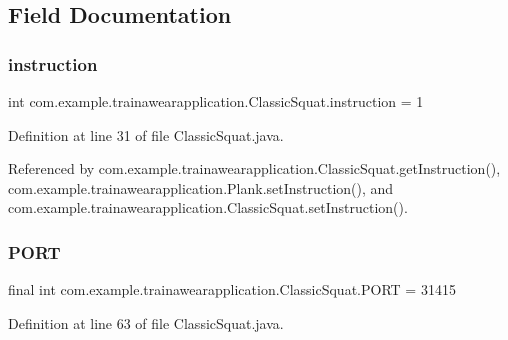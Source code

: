 \subsection{Field Documentation}
\mbox{\label{classcom_1_1example_1_1trainawearapplication_1_1_classic_squat_a3cbf1db0a5560d931ebdaa407a1a6285}} 
\subsubsection{\texorpdfstring{instruction}{instruction}}
{\footnotesize\ttfamily int com.\+example.\+trainawearapplication.\+Classic\+Squat.\+instruction = 1\hspace{0.3cm}{\ttfamily [static]}}



Definition at line 31 of file Classic\+Squat.\+java.



Referenced by com.\+example.\+trainawearapplication.\+Classic\+Squat.\+get\+Instruction(), com.\+example.\+trainawearapplication.\+Plank.\+set\+Instruction(), and com.\+example.\+trainawearapplication.\+Classic\+Squat.\+set\+Instruction().

\mbox{\label{classcom_1_1example_1_1trainawearapplication_1_1_classic_squat_a28250169a237362b6ab0a7412cd12da6}} 
\subsubsection{\texorpdfstring{PORT}{PORT}}
{\footnotesize\ttfamily final int com.\+example.\+trainawearapplication.\+Classic\+Squat.\+P\+O\+RT = 31415\hspace{0.3cm}{\ttfamily [private]}}



Definition at line 63 of file Classic\+Squat.\+java.



